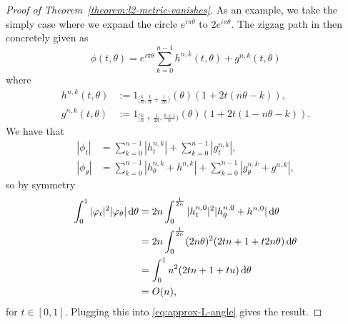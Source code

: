 \message{ !name(mainfile.tex)}\documentclass[a4,danish]{article}
\begin{document}
\begin{proof}[Proof of Theorem~\ref{theorem:l2-metric-vanishes}]
As an example, we take the simply case where we expand the circle $e^{i\pi\theta}$ to
$2e^{i\pi\theta}$. The zigzag path in then concretely given as
\begin{equation*}
  \phi(t,\theta) = e^{i\pi\theta}
  \sum_{k=0}^{n-1}
  h^{n,k}(t,\theta) + g^{n,k}(t,\theta)
\end{equation*}
where
\begin{equation*}
  \begin{aligned}
    h^{n,k}(t,\theta) & := 1_{[\frac{k}{n},\frac{k}{n} +
      \frac{1}{2n})}(\theta) \left( 1+2t(n\theta-k) \right), \\
    g^{n,k}(t,\theta) & := 1_{[\frac{k}{n} + \frac{1}{2n},\frac{k+1}{n})}(\theta)
    \left( 1+2t(1-n\theta-k) \right).
  \end{aligned}
\end{equation*}
We have that
\begin{equation*}
  \begin{aligned}
    |\phi_t| & = \sum_{k=0}^{n-1} |h^{n,k}_t| + \sum_{k=0}^{n-1}
    |g^{n,k}_t|, \\
    |\phi_{\theta}| & = \sum_{k=0}^{n-1} |h^{n,k}_{\theta} + h^{n,k} | +
    \sum_{k=0}^{n-1}
    |g^{n,k}_{\theta} + g^{n,k} |,
  \end{aligned}
\end{equation*}
so by symmetry
\begin{equation*}
  \begin{aligned}
    \int_{0}^{1}
    |\varphi_t|^2   |\varphi_{\theta}|
    \mathop{}\!\mathrm{d} \theta
    & =
    2n \int_{0}^{\frac{1}{2n}} |h^{n,0}_t|^2 |h^{n,0}_{\theta} + h^{n,0} |
    \mathop{}\!\mathrm{d} \theta \\
    & = 2n \int_{0}^{\frac{1}{2n}}
    (2n\theta)^2(2tn+1+t2n\theta) \mathop{}\!\mathrm{d} \theta \\
    & = \int_{0}^1
    u^2(2tn+1+t u) \mathop{}\!\mathrm{d} \theta \\
    & = O(n),
  \end{aligned}
\end{equation*}
for $t\in[0,1]$. Plugging this into \eqref{eq:approx-L-angle} gives the result.
\end{proof}





\end{document}

